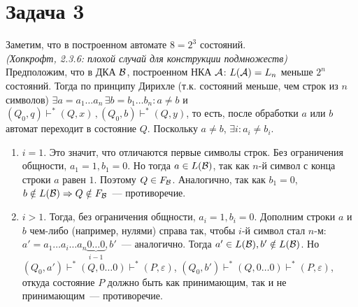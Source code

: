 \documentclass[a4paper]{article}
\def\A{{\cal A}}
\def\B{{\cal B}}
\begin{document}
\section*{Задача 3}
Заметим, что в построенном автомате $8=2^3$ состояний.
\\[10pt]
{\em{(Хопкрофт, 2.3.6: плохой случай для конструкции подмножеств)}}
\\[3pt]
Предположим, что в ДКА $\B$, построенном НКА $\A$: $L(\A)=L_n$ меньше $2^n$ состояний. Тогда по принципу Дирихле (т.к. состояний меньше, чем строк из $n$ символов) $\exists a=a_1\dots a_n\,\exists b=b_1\dots b_n:a\neq b$ и $(Q_0,q)\vdash^*(Q,x)\,,(Q_0,b)\vdash^*(Q,y)$, то есть, после обработки $a$ или $b$ автомат переходит в состояние $Q$. Поскольку $a\neq b$, $\exists i:a_i\neq b_i$.
\begin{enumerate}[1.]
\item $i=1$. Это значит, что отличаются первые символы строк. Без ограничения общности, $a_1=1, b_1=0$. Но тогда $a\in L(\B)$, так как $n$-й символ с конца строки $a$ равен $1$. Поэтому $Q\in F_\B$.\newline
Аналогично, так как $b_1=0$, $b\notin L(\B)\Rightarrow Q\notin F_\B$~--- противоречие.
\item $i>1$. Тогда, без ограничения общности, $a_i=1, b_i=0$. Дополним строки $a$ и $b$ чем-либо (например, нулями) справа так, чтобы $i$-й символ стал $n$-м:
$a'=a_1\dots a_i\dots a_n\underbrace{0\dots 0}_{i-1}, b'$~--- аналогично. Тогда $a'\in L(\B), b'\notin L(\B)$.\newline
Но $(Q_0,a')\vdash^*(Q,0\dots 0)\vdash^*(P,\varepsilon)$,\newline
$(Q_0,b')\vdash^*(Q,0\dots 0)\vdash^*(P,\varepsilon)$, откуда состояние $P$ должно быть как принимающим, так и не принимающим~--- противоречие.
\end{enumerate}
\end{document}
